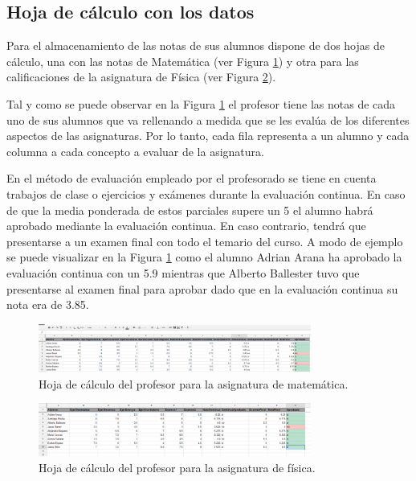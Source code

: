 \subsection{Hoja de cálculo con los datos}

Para el almacenamiento de las notas de sus alumnos dispone de dos hojas de cálculo, una con las notas de Matemática (ver Figura \ref{fig:SheetNotasMate}) y otra para las calificaciones de la asignatura de Física (ver Figura \ref{fig:SheetNotasFisica}).

Tal y como se puede observar en la Figura \ref{fig:SheetNotasMate} el profesor tiene las notas de cada uno de sus alumnos que va rellenando a medida que se les evalúa de los diferentes aspectos de las asignaturas. Por lo tanto, cada fila representa a un alumno y cada columna a cada concepto a evaluar de la asignatura.

En el método de evaluación empleado por el profesorado se tiene en cuenta trabajos de clase o ejercicios y exámenes durante la evaluación continua. En caso de que la media ponderada de estos parciales supere un 5 el alumno habrá aprobado mediante la evaluación continua. En caso contrario, tendrá que presentarse a un examen final con todo el temario del curso. A modo de ejemplo se puede visualizar en la Figura \ref{fig:SheetNotasMate} como el alumno Adrian Arana ha aprobado la evaluación continua con un 5.9 mientras que Alberto Ballester tuvo que presentarse al examen final para aprobar dado que en la evaluación continua su nota era de 3.85.

\begin{figure}[htb]
	\centering
	\includegraphics[width=0.8\textwidth]{./figs/sheetNotasMate.png}
	\caption{Hoja de cálculo del profesor para la asignatura de matemática.} \label{fig:SheetNotasMate}
\end{figure}

\begin{figure}[htb]
	\centering
	\includegraphics[width=0.8\textwidth]{./figs/sheetNotasFisica.png}
	\caption{Hoja de cálculo del profesor para la asignatura de física.} \label{fig:SheetNotasFisica}
\end{figure}

